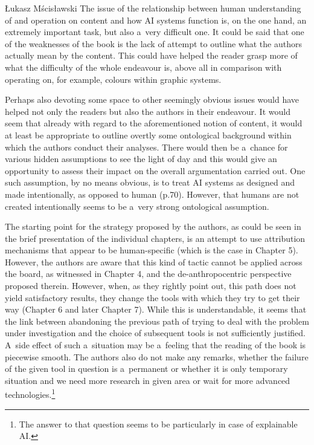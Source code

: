 \begin{newrevengenv}{Łukasz Mścisławski}
The issue of the relationship between human understanding of and operation on content and how AI systems function is, on the one hand, an extremely important task, but also a~very difficult one. It could be said that one of the weaknesses of the book is the lack of attempt to outline what the authors actually mean by the content. This could have helped the reader grasp more of what the difficulty of the whole endeavour is, above all in comparison with operating on, for example, colours within graphic systems.

Perhaps also devoting some space to other seemingly obvious issues would have helped not only the readers but also the authors in their endeavour. It would seem that already with regard to the aforementioned notion of content, it would at least be appropriate to outline overtly some ontological background within which the authors conduct their analyses. There would then be a~chance for various hidden assumptions to see the light of day and this would give an opportunity to assess their impact on the overall argumentation carried out. One such assumption, by no means obvious, is to treat AI systems as designed and made intentionally, as opposed to human (p.70). However, that humans are not created intentionally seems to be a~very strong ontological assumption.

The starting point for the strategy proposed by the authors, as could be seen in the brief presentation of the individual chapters, is an attempt to use attribution mechanisms that appear to be human-specific (which is the case in Chapter 5). However, the authors are aware that this kind of tactic cannot be applied across the board, as witnessed in Chapter 4, and the de-anthropocentric perspective proposed therein. However, when, as they rightly point out, this path does not yield satisfactory results, they change the tools with which they try to get their way (Chapter 6 and later Chapter 7). While this is understandable, it seems that the link between abandoning the previous path of trying to deal with the problem under investigation and the choice of subsequent tools is not sufficiently justified. A~side effect of such a~situation may be a~feeling that the reading of the book is piecewise smooth. The authors also do not make any remarks, whether the failure of the given tool in question is a~permanent or whether it is only temporary situation and we need more research in given area or wait for more advanced technologies.\footnote{The answer to that question seems to be particularly in case of explainable AI.}


\end{newrevengenv}
